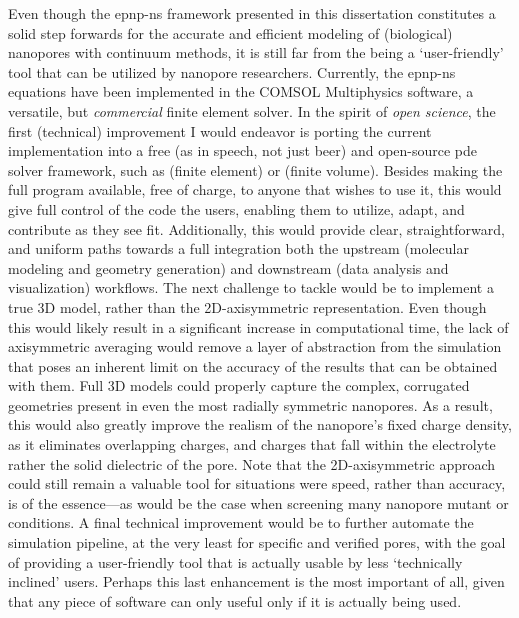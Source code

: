 Even though the \gls{epnp-ns} framework presented in this dissertation constitutes a solid step forwards for
the accurate and efficient modeling of (biological) nanopores with continuum methods, it is still far from the
being a `user-friendly' tool that can be utilized by nanopore researchers. Currently, the \gls{epnp-ns}
equations have been implemented in the COMSOL Multiphysics software, a versatile, but \emph{commercial} finite
element solver. In the spirit of \emph{open science}, the first (technical) improvement I would endeavor is
porting the current implementation into a free (as in speech, not just beer) and open-source \gls{pde} solver
framework, such as  (finite element) or  (finite volume). Besides making the full
program available, free of charge, to anyone that wishes to use it, this would give full control of the code
the users, enabling them to utilize, adapt, and contribute as they see fit. Additionally, this would provide
clear, straightforward, and uniform paths towards a full integration both the upstream (molecular modeling and
geometry generation) and downstream (data analysis and visualization) workflows. The next challenge to tackle
would be to implement a true 3D model, rather than the 2D-axisymmetric representation. Even though this would
likely result in a significant increase in computational time, the lack of axisymmetric averaging would remove
a layer of abstraction from the simulation that poses an inherent limit on the accuracy of the results that
can be obtained with them. Full 3D models could properly capture the complex, corrugated geometries present in
even the most radially symmetric nanopores. As a result, this would also greatly improve the realism of the
nanopore's fixed charge density, as it eliminates overlapping charges, and charges that fall within the
electrolyte rather the solid dielectric of the pore. Note that the 2D-axisymmetric approach could still remain
a valuable tool for situations were speed, rather than accuracy, is of the essence---as would be the case when
screening many nanopore mutant or conditions. A final technical improvement would be to further automate the
simulation pipeline, at the very least for specific and verified pores, with the goal of providing a
user-friendly tool that is actually usable by less `technically inclined' users.\footnotemark%
%
%
Perhaps this last enhancement is the most important of all, given that any piece of software can only useful
only if it is actually being used.


